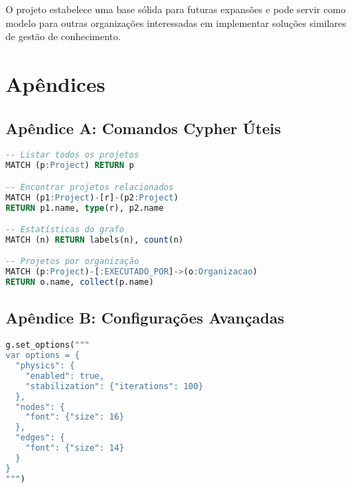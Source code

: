\documentclass[12pt,a4paper]{article}
\begin{document}
O projeto estabelece uma base sólida para futuras expansões e pode servir como modelo para outras organizações interessadas em implementar soluções similares de gestão de conhecimento.

\newpage
\section{Apêndices}

\subsection{Apêndice A: Comandos Cypher Úteis}

\begin{lstlisting}[language=sql, caption=Consultas Cypher Essenciais]
-- Listar todos os projetos
MATCH (p:Project) RETURN p

-- Encontrar projetos relacionados
MATCH (p1:Project)-[r]-(p2:Project) 
RETURN p1.name, type(r), p2.name

-- Estatísticas do grafo
MATCH (n) RETURN labels(n), count(n)

-- Projetos por organização
MATCH (p:Project)-[:EXECUTADO_POR]->(o:Organizacao)
RETURN o.name, collect(p.name)
\end{lstlisting}

\subsection{Apêndice B: Configurações Avançadas}

\begin{lstlisting}[language=python, caption=Configurações do PyVis]
g.set_options("""
var options = {
  "physics": {
    "enabled": true,
    "stabilization": {"iterations": 100}
  },
  "nodes": {
    "font": {"size": 16}
  },
  "edges": {
    "font": {"size": 14}
  }
}
""")
\end{lstlisting}
\end{document}

